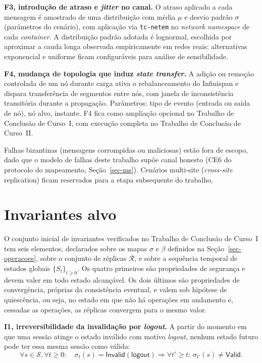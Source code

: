 \textbf{F3, introdução de atraso e \emph{jitter} no canal.} O atraso aplicado a cada mensagem é amostrado de uma distribuição com média $\mu$ e desvio padrão $\sigma$ (parâmetros do cenário), com aplicação via \texttt{tc-netem} \citep{netem_manpage} no \emph{network namespace} de cada \emph{container}. A distribuição padrão adotada é lognormal, escolhida por aproximar a cauda longa observada empiricamente em redes reais; alternativas exponencial e uniforme ficam configuráveis para análise de sensibilidade. 

\textbf{F4, mudança de topologia que induz \emph{state transfer}.} A adição ou remoção controlada de um nó durante carga ativa o rebalanceamento do Infinispan e dispara transferência de segmentos entre nós, com janela de inconsistência transitória durante a propagação. Parâmetros: tipo de evento (entrada ou saída de nó), nó alvo, instante. F4 fica como ampliação opcional no Trabalho de Conclusão de Curso~I, com execução completa no Trabalho de Conclusão de Curso~II. 

Falhas bizantinas (mensagens corrompidas ou maliciosas) estão fora de escopo, dado que o modelo de falhas deste trabalho supõe canal honesto (CE6 do protocolo do mapeamento, Seção~\ref{sec-ms}). Cenários multi-site (\emph{cross-site} replication) ficam reservados para a etapa subsequente do trabalho. 

\section*{Invariantes alvo}
\label{sec-invariantes}

O conjunto inicial de invariantes verificados no Trabalho de Conclusão de Curso~I tem seis elementos, declarados sobre os mapas $\sigma$ e $\beta$ definidos na Seção~\ref{sec-operacoes}, sobre o conjunto de réplicas $\mathcal{R}$, e sobre a sequência temporal de estados globais $\{S_t\}_{t \ge 0}$. Os quatro primeiros são propriedades de segurança e devem valer em todo estado alcançável. Os dois últimos são propriedades de convergência, próprias da consistência eventual, e valem sob hipótese de quiescência, ou seja, no estado em que não há operações em andamento e, cessadas as operações, as réplicas convergem para o mesmo valor. 

\textbf{I1, irreversibilidade da invalidação por \emph{logout}.} A partir do momento em que uma sessão atinge o estado inválido com motivo \emph{logout}, nenhum estado futuro pode ter essa mesma sessão como válida:
\[
\forall s \in \mathcal{S}, \forall t \ge 0: \quad \sigma_t(s) = \textsf{Invalid}(\textsf{logout}) \Rightarrow \forall t' \ge t: \, \sigma_{t'}(s) \ne \textsf{Valid}.
\]

